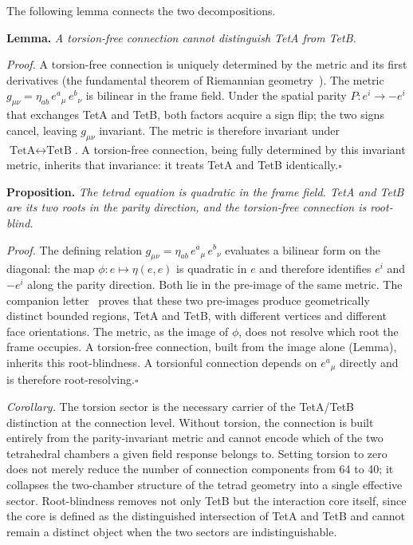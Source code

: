 \documentclass[twocolumn]{iopjournal}
\begin{document}
The following lemma connects the two decompositions.

\medskip
\noindent\textbf{Lemma.} \textit{A torsion-free connection
cannot distinguish TetA from TetB.}

\medskip\noindent\textit{Proof.}
A torsion-free connection is uniquely determined by the metric
and its first derivatives (the fundamental theorem of Riemannian
geometry~\cite{MTW}). The metric
$g_{\mu\nu} = \eta_{ab}\,e^a{}_\mu\,e^b{}_\nu$ is bilinear in
the frame field. Under the spatial parity
$P: e^i \to -e^i$ that exchanges TetA and TetB, both factors
acquire a sign flip; the two signs cancel, leaving $g_{\mu\nu}$
invariant. The metric is therefore invariant under
$\text{TetA} \leftrightarrow \text{TetB}$. A torsion-free
connection, being fully determined by this invariant metric,
inherits that invariance: it treats TetA and TetB
identically.\hfill$\square$

\medskip
\noindent\textbf{Proposition.} \textit{The tetrad equation is
quadratic in the frame field. TetA and TetB are its two roots
in the parity direction, and the torsion-free connection is
root-blind.}

\medskip\noindent\textit{Proof.}
The defining relation
$g_{\mu\nu} = \eta_{ab}\,e^a{}_\mu\,e^b{}_\nu$ evaluates a
bilinear form on the diagonal: the map
$\phi: e \mapsto \eta(e,e)$ is quadratic in $e$ and therefore
identifies $e^i$ and $-e^i$ along the parity direction. Both
lie in the pre-image of the same metric. The companion
letter~\cite{Nelson2026a} proves that these two pre-images
produce geometrically distinct bounded regions, TetA and
TetB, with different vertices and different face
orientations. The metric, as the image of $\phi$, does not
resolve which root the frame occupies. A torsion-free
connection, built from the image alone (Lemma), inherits this
root-blindness. A torsionful connection depends on
$e^a{}_\mu$ directly and is therefore
root-resolving.\hfill$\square$

\medskip
\noindent\textit{Corollary.} The torsion sector is the
necessary carrier of the TetA/TetB distinction at the
connection level. Without torsion, the connection is built
entirely from the parity-invariant metric and cannot encode
which of the two tetrahedral chambers a given field response
belongs to. Setting torsion to zero does not merely reduce the
number of connection components from 64 to 40; it collapses the
two-chamber structure of the tetrad geometry into a single
effective sector. Root-blindness removes not only TetB but the
interaction core itself, since the core is defined as the
distinguished intersection of TetA and TetB and cannot remain a
distinct object when the two sectors are indistinguishable.
\end{document}
